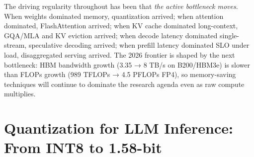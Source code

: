The driving regularity throughout has been that \emph{the active bottleneck moves}. When weights dominated memory, quantization arrived; when attention dominated, FlashAttention arrived; when KV cache dominated long-context, GQA/MLA and KV eviction arrived; when decode latency dominated single-stream, speculative decoding arrived; when prefill latency dominated SLO under load, disaggregated serving arrived. The 2026 frontier is shaped by the next bottleneck: HBM bandwidth growth (3.35 → 8 TB/s on B200/HBM3e) is slower than FLOPs growth (989 TFLOPs → 4.5 PFLOPs FP4), so memory-saving techniques will continue to dominate the research agenda even as raw compute multiplies.

\section{Quantization for LLM Inference: From INT8 to 1.58-bit}\label{quantization-for-llm-inference-from-int8-to-1.58-bit}

